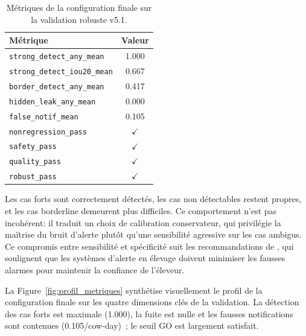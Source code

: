 \begin{table}[H]
    \centering
    \caption{Métriques de la configuration finale sur la validation robuste v5.1.}
    \label{tab:robust_final}
    \begin{tabular}{lc}
        \toprule
        \textbf{Métrique}                               & \textbf{Valeur} \\
        \midrule
        \texttt{strong\_detect\_any\_mean}               & 1.000 \\
        \texttt{strong\_detect\_iou20\_mean}             & 0.667 \\
        \texttt{border\_detect\_any\_mean}               & 0.417 \\
        \texttt{hidden\_leak\_any\_mean}                 & 0.000 \\
        \texttt{false\_notif\_mean}                      & 0.105 \\
        \midrule
        \texttt{nonregression\_pass}                     & $\checkmark$ \\
        \texttt{safety\_pass}                            & $\checkmark$ \\
        \texttt{quality\_pass}                           & $\checkmark$ \\
        \texttt{robust\_pass}                            & $\checkmark$ \\
        \bottomrule
    \end{tabular}
\end{table}

Les cas forts sont correctement détectés, les cas non détectables restent propres, et les cas
borderline demeurent plus difficiles. Ce comportement n'est pas incohérent: il
traduit un choix de calibration conservateur, qui privilégie la maîtrise du bruit d'alerte
plutôt qu'une sensibilité agressive sur les cas ambigus. Ce compromis entre sensibilité et
spécificité suit les recommandations de \cite{rutten2013invited}, qui soulignent
que les systèmes d'alerte en élevage doivent minimiser les fausses alarmes pour maintenir la
confiance de l'éleveur.

La Figure~\ref{fig:profil_metriques} synthétise visuellement le profil de la configuration
finale sur les quatre dimensions clés de la validation. La détection des cas forts est
maximale (1.000), la fuite est nulle et les fausses notifications sont contenues
(0.105/cow-day)~; le seuil GO est largement satisfait.

